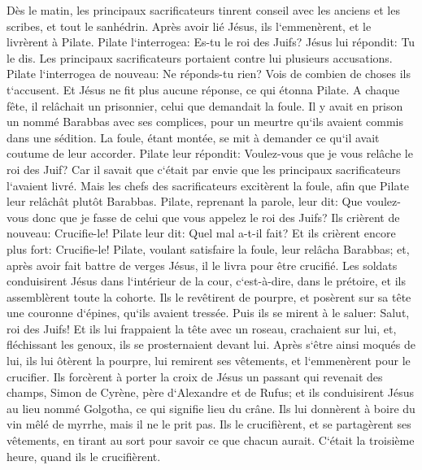 \verse Dès le matin, les principaux sacrificateurs tinrent conseil avec les anciens et les scribes, et tout le sanhédrin. Après avoir lié Jésus, ils l`emmenèrent, et le livrèrent à Pilate. 
\verse Pilate l`interrogea: Es-tu le roi des Juifs? Jésus lui répondit: Tu le dis. 
\verse Les principaux sacrificateurs portaient contre lui plusieurs accusations. 
\verse Pilate l`interrogea de nouveau: Ne réponds-tu rien? Vois de combien de choses ils t`accusent. 
\verse Et Jésus ne fit plus aucune réponse, ce qui étonna Pilate. 
\verse A chaque fête, il relâchait un prisonnier, celui que demandait la foule. 
\verse Il y avait en prison un nommé Barabbas avec ses complices, pour un meurtre qu`ils avaient commis dans une sédition. 
\verse La foule, étant montée, se mit à demander ce qu`il avait coutume de leur accorder. 
\verse Pilate leur répondit: Voulez-vous que je vous relâche le roi des Juif? 
\verse Car il savait que c`était par envie que les principaux sacrificateurs l`avaient livré. 
\verse Mais les chefs des sacrificateurs excitèrent la foule, afin que Pilate leur relâchât plutôt Barabbas. 
\verse Pilate, reprenant la parole, leur dit: Que voulez-vous donc que je fasse de celui que vous appelez le roi des Juifs? 
\verse Ils crièrent de nouveau: Crucifie-le! 
\verse Pilate leur dit: Quel mal a-t-il fait? Et ils crièrent encore plus fort: Crucifie-le! 
\verse Pilate, voulant satisfaire la foule, leur relâcha Barabbas; et, après avoir fait battre de verges Jésus, il le livra pour être crucifié. 
\verse Les soldats conduisirent Jésus dans l`intérieur de la cour, c`est-à-dire, dans le prétoire, et ils assemblèrent toute la cohorte. 
\verse Ils le revêtirent de pourpre, et posèrent sur sa tête une couronne d`épines, qu`ils avaient tressée. 
\verse Puis ils se mirent à le saluer: Salut, roi des Juifs! 
\verse Et ils lui frappaient la tête avec un roseau, crachaient sur lui, et, fléchissant les genoux, ils se prosternaient devant lui. 
\verse Après s`être ainsi moqués de lui, ils lui ôtèrent la pourpre, lui remirent ses vêtements, et l`emmenèrent pour le crucifier. 
\verse Ils forcèrent à porter la croix de Jésus un passant qui revenait des champs, Simon de Cyrène, père d`Alexandre et de Rufus; 
\verse et ils conduisirent Jésus au lieu nommé Golgotha, ce qui signifie lieu du crâne. 
\verse Ils lui donnèrent à boire du vin mêlé de myrrhe, mais il ne le prit pas. 
\verse Ils le crucifièrent, et se partagèrent ses vêtements, en tirant au sort pour savoir ce que chacun aurait. 
\verse C`était la troisième heure, quand ils le crucifièrent. 
